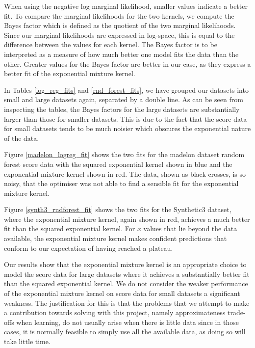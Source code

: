 \documentclass[a4paper,12pt,twoside,openright]{report}
\begin{document}
When using the negative log marginal likelihood, smaller values indicate a better fit. To compare the marginal likelihoods for the two kernels, we compute the Bayes factor which is defined as the quotient of the two marginal likelihoods. Since our marginal likelihoods are expressed in log-space, this is equal to the difference between the values for each kernel. The Bayes factor is to be interpreted as a measure of how much better one model fits the data than the other. Greater values for the Bayes factor are better in our case, as they express a better fit of the exponential mixture kernel.

In Tables \ref{log_reg_fits} and \ref{rnd_forest_fits}, we have grouped our datasets into small and large datasets again, separated by a double line. As can be seen from inspecting the tables, the Bayes factors for the large datasets are substantially larger than those for smaller datasets. This is due to the fact that the score data for small datasets tends to be much noisier which obscures the exponential nature of the data.

Figure \ref{madelon_logreg_fit} shows the two fits for the madelon dataset random forest score data with the squared exponential kernel shown in blue and the exponential mixture kernel shown in red. The data, shown as black crosses, is so noisy, that the optimiser was not able to find a sensible fit for the exponential mixture kernel.

Figure \ref{synth3_rndforest_fit} shows the two fits for the Synthetic3 dataset, where the exponential mixture kernel, again shown in red, achieves a much better fit than the squared exponential kernel. For $x$ values that lie beyond the data  available, the exponential mixture kernel makes confident predictions that conform to our expectation of having reached a plateau.


Our results show that the exponential mixture kernel is an appropriate choice to model the score data for large datasets where it achieves a substantially better fit than the squared exponential kernel. We do not consider the weaker performance of the exponential mixture kernel on score data for small datasets a significant weakness. The justification for this is that the problems that we attempt to make a contribution towards solving with this project, namely approximateness trade-offs when learning, do not usually arise when there is little data since in those cases, it is normally feasible to simply use all the available data, as doing so will take little time.
\end{document}
